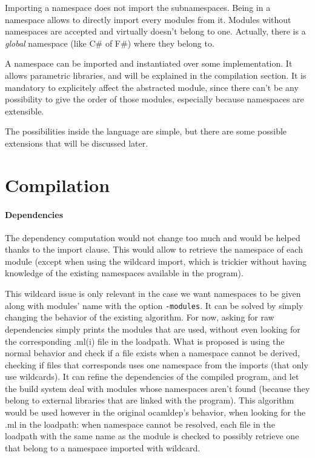 \documentclass[11pt,a4paper]{article}
\begin{document}
Importing a namespace does not import the subnamespaces. Being in a namespace
allows to directly import every modules from it. Modules without namespaces are
accepted and virtually doesn't belong to one. Actually, there is a \emph{global}
namespace (like C\# of F\#) where they belong to.

A namespace can be imported and instantiated over some implementation. It allows
parametric libraries, and will be explained in the compilation section. It is
mandatory to explicitely affect the abstracted module, since there can't be any
possibility to give the order of those modules, especially because namespaces
are extensible.

The possibilities inside the language are simple, but there are some possible
extensions that will be discussed later.

\section{Compilation}

\paragraph{Dependencies}

The dependency computation would not change too much and would be helped thanks
to the import clause. This would allow to retrieve the namespace of each module
(except when using the wildcard import, which is trickier without having
knowledge of the existing namespaces available in the program).

This wildcard issue is only relevant in the case we want namespaces to be given
along with modules' name with the option \texttt{-modules}. It can be solved by
simply changing the behavior of the existing algorithm. For now, asking for raw
dependencies simply prints the modules that are used, without even looking for
the corresponding .ml(i) file in the loadpath. What is proposed is using the
normal behavior and check if a file exists when a namespace cannot be derived,
checking if files that corresponds uses one namespace from the imports (that
only use wildcards). It can refine the dependencies of the compiled program, and
let the build system deal with modules whose namespaces aren't found (because
they belong to external libraries that are linked with the program). This
algorithm would be used however in the original ocamldep's behavior, when
looking for the .ml in the loadpath: when namespace cannot be resolved, each file
in the loadpath with the same name as the module is checked to possibly retrieve
one that belong to a namespace imported with wildcard.
\end{document}
